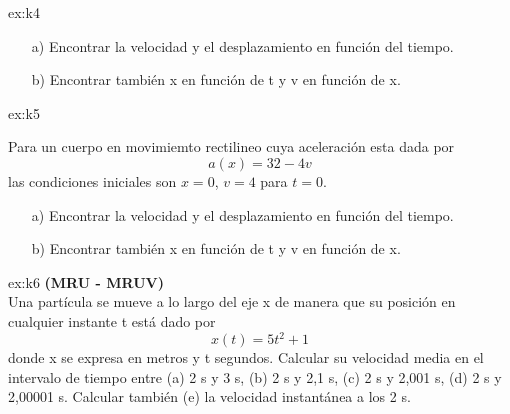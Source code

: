 \begin{multicols}{2}
\begin{excercise}[][][a) $v(t) = \displaystyle{\frac{v_0}{1+kv_0t}}$, $x(t)=x_0+\displaystyle{\frac{1}{k}}\ln(1+kv_0t)$; b) $v(x)=\displaystyle{v_0e^{-k(x-x_0)}}$]{ex:k4}
{\begin{itemize}
             \item[a)] Encontrar la velocidad y el desplazamiento en función del tiempo.
             \item[b)] Encontrar también x en función de t y  v en función de x.
         \end{itemize}
        }
    \end{excercise}
\begin{excercise}[][][a) $v(t) = \displaystyle{8-4e^{4-t}}$, $x(t)=\diplaystyle{8t+e^{-4t}}-1$; b) $x(v)=\displaystyle{-2\ln{(8-v)}-\frac{v}{4}+4\ln 2+1}$]{ex:k5}{
         Para un cuerpo en movimiemto rectilineo cuya aceleración esta dada por 
         \begin{equation*}
             a(x)=32-4v
         \end{equation*}
         las condiciones iniciales son $x=0$,  $v=4$ para $t=0$.
         \begin{itemize}
             \item[a)] Encontrar la velocidad y el desplazamiento en función del tiempo.
             \item[b)] Encontrar también x en función de t y  v en función de x.
         \end{itemize}
        }
    \end{excercise}
     \begin{excercise}[][][a) $v = 25\ (\mathrm{ms^{-1}})$, b) $v = 20.5\ (\mathrm{ms^{-1}})$, c) $v = 20.005\ (\mathrm{ms^{-1}})$, d) $v = 20.00005\ (\mathrm{ms^{-1}})$, e) $v = 20\ (\mathrm{ms^{-1}})$,]{ex:k6}{
        \textbf{(MRU - MRUV)}\\
        Una partícula se mueve a lo largo del eje x de manera que su posición en cualquier instante t está dado por 
        \begin{equation*}
            x(t)=5t^2+1 
        \end{equation*}
        donde x se expresa en metros y t segundos. Calcular su velocidad media en el intervalo de tiempo entre (a) 2 s y 3 s, (b) 2 s y 2,1 s, (c) 2 s y 2,001 s, (d) 2 s y 2,00001 s. Calcular también (e) la velocidad instantánea a los 2 s.
         }
     \end{excercise} 



\end{multicols}
